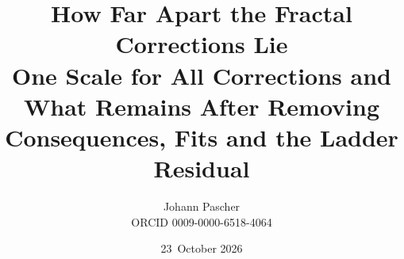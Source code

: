 \documentclass[11pt,a4paper]{report}
\title{How Far Apart the Fractal Corrections Lie\\[0.5em]
  \large One Scale for All Corrections and What Remains After Removing Consequences, Fits and the Ladder Residual}
\date{23~October 2026}
\author{Johann Pascher\\\small ORCID 0009-0000-6518-4064}
\begin{document}
\renewcommand{\thechapter}{}
\renewcommand{\thesection}{\arabic{section}}
\maketitle
\tableofcontents

\end{document}
